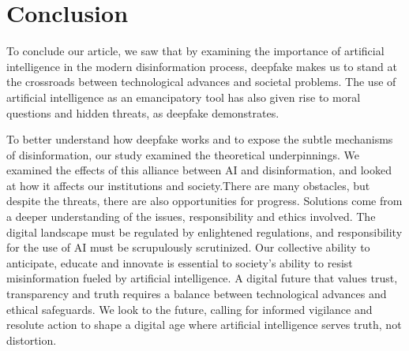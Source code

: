 \section{Conclusion}
To conclude our article, we saw that by examining the importance of artificial intelligence in the modern disinformation process, deepfake makes us to stand at the crossroads between technological advances and societal problems. The use of artificial intelligence as an emancipatory tool has also given rise to moral questions and hidden threats, as deepfake demonstrates.

To better understand how deepfake works and to expose the subtle mechanisms of disinformation, our study examined the theoretical underpinnings. We examined the effects of this alliance between AI and disinformation, and looked at how it affects our institutions and society.There are many obstacles, but despite the threats, there are also opportunities for progress. Solutions come from a deeper understanding of the issues, responsibility and ethics involved.
The digital landscape must be regulated by enlightened regulations, and responsibility for the use of AI must be scrupulously scrutinized. Our collective ability to anticipate, educate and innovate is essential to society's ability to resist misinformation fueled by artificial intelligence. A digital future that values trust, transparency and truth requires a balance between technological advances and ethical safeguards. We look to the future, calling for informed vigilance and resolute action to shape a digital age where artificial intelligence serves truth, not distortion.
